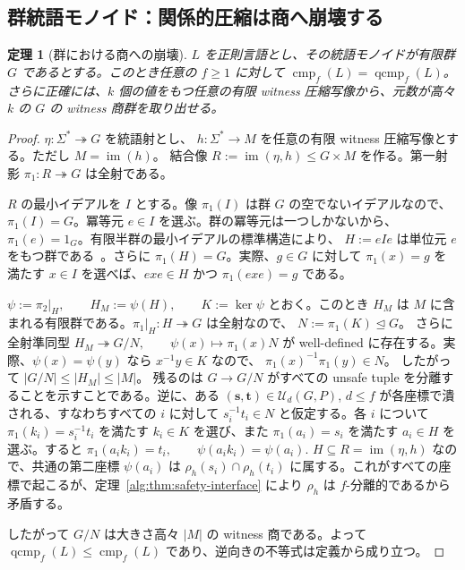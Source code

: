 \documentclass[10pt,a4paper]{ltjsarticle}
\newtheorem{theorem}{定理}[section]
\theoremstyle{definition}
\theoremstyle{remark}
\newcommand{\cmp}{\operatorname{cmp}}
\newcommand{\qcmp}{\operatorname{qcmp}}
\begin{document}
\subsection{群統語モノイド：関係的圧縮は商へ崩壊する}

\begin{theorem}[群における商への崩壊]
\label{group:thm:quotient-collapse}
$L$ を正則言語とし、その統語モノイドが有限群 $G$ であるとする。このとき任意の $f\ge1$ に対して
\(\cmp_f(L)=\qcmp_f(L)\)。
さらに正確には、$k$ 個の値をもつ任意の有限 witness 圧縮写像から、元数が高々 $k$ の $G$ の witness 商群を取り出せる。
\end{theorem}

\begin{proof}
\(\eta:\Sigma^*\twoheadrightarrow G\)
を統語射とし、
\(h:\Sigma^*\to M\)
を任意の有限 witness 圧縮写像とする。ただし
$M=\operatorname{im}(h)$。
結合像
\(R:=\operatorname{im}(\eta,h)\le G\times M\)
を作る。第一射影
\(\pi_1:R\twoheadrightarrow G\)
は全射である。

$R$ の最小イデアルを $I$ とする。像 $\pi_1(I)$ は群 $G$ の空でないイデアルなので、$\pi_1(I)=G$。冪等元 $e\in I$ を選ぶ。群の冪等元は一つしかないから、$\pi_1(e)=1_G$。有限半群の最小イデアルの標準構造により、
\(H:=eIe\)
は単位元 $e$ をもつ群である~\cite{Howie1995}。さらに $\pi_1(H)=G$。実際、$g\in G$ に対して $\pi_1(x)=g$ を満たす $x\in I$ を選べば、$exe\in H$ かつ $\pi_1(exe)=g$ である。

\(
\psi:=\pi_2|_H,
\qquad H_M:=\psi(H),
\qquad K:=\ker\psi
\)
とおく。このとき $H_M$ は $M$ に含まれる有限群である。$\pi_1|_H:H\twoheadrightarrow G$ は全射なので、
\(N:=\pi_1(K)\trianglelefteq G\)。
さらに全射準同型
\(
H_M\twoheadrightarrow G/N,
\qquad
\psi(x)\longmapsto \pi_1(x)N
\)
が well-defined に存在する。実際、$\psi(x)=\psi(y)$ なら $x^{-1}y\in K$ なので、
$\pi_1(x)^{-1}\pi_1(y)\in N$。
したがって
\(|G/N|\le |H_M|\le |M|\)。
残るのは $G\to G/N$ がすべての unsafe tuple を分離することを示すことである。逆に、ある
$(\mathbf s,\mathbf t)\in\mathcal U_d(G,P)$, $d\le f$
が各座標で潰される、すなわちすべての $i$ に対して $s_i^{-1}t_i\in N$ と仮定する。各 $i$ について $\pi_1(k_i)=s_i^{-1}t_i$ を満たす $k_i\in K$ を選び、また $\pi_1(a_i)=s_i$ を満たす $a_i\in H$ を選ぶ。すると
\(
\pi_1(a_ik_i)=t_i,
\qquad
\psi(a_ik_i)=\psi(a_i).
\)
$H\subseteq R=\operatorname{im}(\eta,h)$ なので、共通の第二座標 $\psi(a_i)$ は
\(\rho_h(s_i)\cap\rho_h(t_i)\)
に属する。これがすべての座標で起こるが、定理~\ref{alg:thm:safety-interface} により $\rho_h$ は $f$-分離的であるから矛盾する。

したがって $G/N$ は大きさ高々 $|M|$ の witness 商である。よって
\(\qcmp_f(L)\le\cmp_f(L)\)
であり、逆向きの不等式は定義から成り立つ。
\end{proof}
\end{document}
